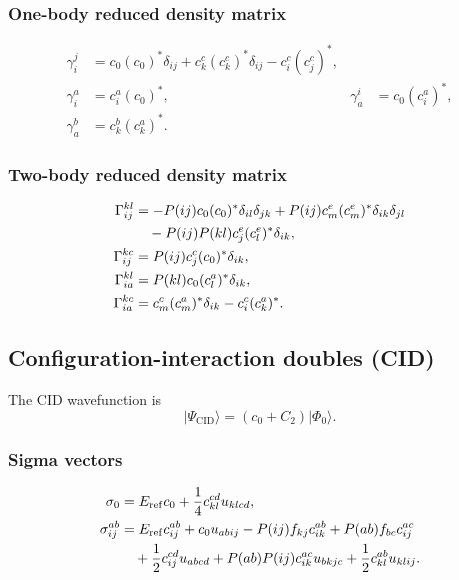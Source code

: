 \documentclass[11pt]{article}
\newcommand{\Eref}{E_{\mathrm{ref}}}
\newcommand{\vac}{\Phi_0}
\begin{document}
\subsubsection{One-body reduced density matrix}

\begin{align}
 \gamma^j_i
 &= c_0(c_0)^*\delta_{ij}
    +c_k^c(c_k^c)^*\delta_{ij}
    -c_i^c(c_j^c)^*,
 \\
 \gamma^a_i
 &= c_i^a(c_0)^*,
 &
 \gamma^i_a
 &= c_0(c_i^a)^*,
 \\
 \gamma^b_a
 &= c_k^b(c_k^a)^*.
\end{align}

\subsubsection{Two-body reduced density matrix}

\begin{align}
 \Gamma^{kl}_{ij}
 &= -P(ij)c_0(c_0)^*\delta_{il}\delta_{jk}
    +P(ij)c_m^e(c_m^e)^*\delta_{ik}\delta_{jl}
 \notag\\
 &\quad
    -P(ij)P(kl)c_j^e(c_l^e)^*\delta_{ik},
 \\
 \Gamma^{kc}_{ij}
 &= P(ij)c_j^c(c_0)^*\delta_{ik},
 \\
 \Gamma^{kl}_{ia}
 &= P(kl)c_0(c_l^a)^*\delta_{ik},
 \\
 \Gamma^{kc}_{ia}
 &= c_m^c(c_m^a)^*\delta_{ik}-c_i^c(c_k^a)^*.
\end{align}


\subsection{Configuration-interaction doubles (CID)}

The CID wavefunction is
\begin{equation}
 \lvert\Psi_{\mathrm{CID}}\rangle
 = (c_0+C_2)\lvert\vac\rangle.
\end{equation}

\subsubsection{Sigma vectors}

\begin{align}
 \sigma_0
 &= \Eref c_0+\frac{1}{4}c_{kl}^{cd}u_{klcd},
 \\
 \sigma_{ij}^{ab}
 &= \Eref c_{ij}^{ab}+c_0u_{abij}
    -P(ij)f_{kj}c_{ik}^{ab}
    +P(ab)f_{bc}c_{ij}^{ac}
 \notag\\
 &\quad
    +\frac{1}{2}c_{ij}^{cd}u_{abcd}
    +P(ab)P(ij)c_{ik}^{ac}u_{bkjc}
    +\frac{1}{2}c_{kl}^{ab}u_{klij}.
\end{align}
\end{document}
